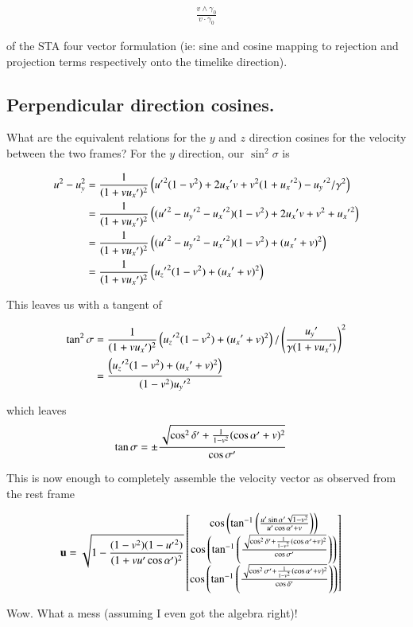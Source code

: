 \begin{align*}
\frac{v \wedge \gamma_0}{v \cdot \gamma_0}
\end{align*}

of the STA four vector formulation (ie: sine and cosine mapping to rejection and projection terms respectively onto the timelike direction).

\subsection{Perpendicular direction cosines. }

What are the equivalent relations for the $y$ and $z$ direction cosines for the velocity between the two frames?  For the $y$ direction, our $\sin^2\sigma$ is

\begin{align*}
u^2 - u_y^2
&=
\frac{1}{( 1 + v {u_x}' )^2 } \left(
{{u}'}^2(1-v^2)
+ 2 {u_x}' v
+v^2 (1 + {{u_x}'}^2)
-{{u_y}'}^2/\gamma^2
\right) \\
&=
\frac{1}{( 1 + v {u_x}' )^2 } \left(
({{u}'}^2 - {{u_y}'}^2 -{{u_x}'}^2)(1-v^2)
+ 2 {u_x}' v
+v^2 
+ {{u_x}'}^2
\right) \\
&=
\frac{1}{( 1 + v {u_x}' )^2 } \left(
({{u}'}^2 - {{u_y}'}^2 -{{u_x}'}^2)(1-v^2)
+ ({u_x}' + v)^2
\right) \\
&=
\frac{1}{( 1 + v {u_x}' )^2 } \left(
{{u_z}'}^2(1-v^2)
+ ({u_x}' + v)^2
\right) \\
\end{align*}

This leaves us with a tangent of 

\begin{align*}
\tan^2\sigma
&=
\frac{1}{( 1 + v {u_x}' )^2 } \left(
{{u_z}'}^2(1-v^2)
+ ({u_x}' + v)^2
\right)
/\left(\frac{{u_y}'}{\gamma (1 + v {u_x}')}\right)^2 \\
&=
\frac{ \left(
{{u_z}'}^2(1-v^2)
+ ({u_x}' + v)^2
\right)
}{(1-v^2){{u_y}'}^2}
\end{align*}

which leaves
\begin{align*}
\tan\sigma 
&= \pm \frac{ \sqrt{ \cos^2\delta' + \frac{1}{1-v^2}(\cos\alpha' + v)^2 } }{\cos\sigma'}
\end{align*}

This is now enough to completely assemble the 
velocity vector as observed from the rest frame

\begin{align*}
\mathbf{u} &=
\sqrt{1 -\frac{(1 -v^2 ) (1 -{{u}'}^2)}{( 1 + v u' \cos\alpha' )^2 }}
\begin{bmatrix}
\cos\left(\tan^{-1}\left(\frac{ u' \sin\alpha' \sqrt{1-v^2}}{ u'\cos\alpha' + v  }\right)\right) \\
\cos\left(\tan^{-1}\left(\frac{ \sqrt{ \cos^2\delta' + \frac{1}{1-v^2}(\cos\alpha' + v)^2 } }{\cos\sigma'}\right)\right) \\
\cos\left(\tan^{-1}\left(\frac{ \sqrt{ \cos^2\sigma' + \frac{1}{1-v^2}(\cos\alpha' + v)^2 } }{\cos\delta'}\right)\right)
\end{bmatrix}
\end{align*}

Wow.  What a mess (assuming I even got the algebra right)!

%
%

%
